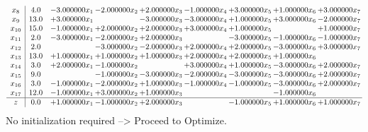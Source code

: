 \documentclass[10pt]{article}
\begin{document}
\[\begin{array}{c| c c@{\hskip 2pt} c@{\hskip 2pt} c@{\hskip 2pt} c@{\hskip 2pt} c@{\hskip 2pt} c@{\hskip 2pt} c@{\hskip 2pt} }
 x_{8}   &  4.0 & -3.000000 x_{1} & -2.000000 x_{2} & + 2.000000 x_{3} & -1.000000 x_{4} & + 3.000000 x_{5} & + 1.000000 x_{6} & + 3.000000 x_{7}\\
 x_{9}   &  13.0 & + 3.000000 x_{1} &   & -3.000000 x_{3} & -3.000000 x_{4} & + 1.000000 x_{5} & + 3.000000 x_{6} & -2.000000 x_{7}\\
 x_{10}   &  15.0 & -1.000000 x_{1} & + 2.000000 x_{2} & + 2.000000 x_{3} & + 3.000000 x_{4} & + 1.000000 x_{5} &   & + 1.000000 x_{7}\\
 x_{11}   &  2.0 & -3.000000 x_{1} & -2.000000 x_{2} & + 2.000000 x_{3} &   & -3.000000 x_{5} & -1.000000 x_{6} & -1.000000 x_{7}\\
 x_{12}   &  2.0  &   & -3.000000 x_{2} & -2.000000 x_{3} & + 2.000000 x_{4} & + 2.000000 x_{5} & -3.000000 x_{6} & + 3.000000 x_{7}\\
 x_{13}   &  13.0 & + 1.000000 x_{1} & + 1.000000 x_{2} & + 1.000000 x_{3} & + 2.000000 x_{4} & + 2.000000 x_{5} & + 1.000000 x_{6} &   \\
 x_{14}   &  3.0 & + 2.000000 x_{1} & -1.000000 x_{2} &   & + 3.000000 x_{4} & + 1.000000 x_{5} & -3.000000 x_{6} & + 2.000000 x_{7}\\
 x_{15}   &  9.0  &   & -1.000000 x_{2} & -3.000000 x_{3} & -2.000000 x_{4} & -3.000000 x_{5} & -3.000000 x_{6} & + 2.000000 x_{7}\\
 x_{16}   &  3.0 & -1.000000 x_{1} & -2.000000 x_{2} & + 1.000000 x_{3} & -1.000000 x_{4} & -1.000000 x_{5} & -3.000000 x_{6} & + 2.000000 x_{7}\\
 x_{17}   &  12.0 & -1.000000 x_{1} & + 3.000000 x_{2} & + 1.000000 x_{3} &    &   & -1.000000 x_{6} &   \\
\hline
z    &  0.0 & + 1.000000 x_{1} & -1.000000 x_{2} & + 2.000000 x_{3} &   & -1.000000 x_{5} & + 1.000000 x_{6} & + 1.000000 x_{7}\\
\end{array}\]
No initialization required --> Proceed to Optimize. 
\end{document}
